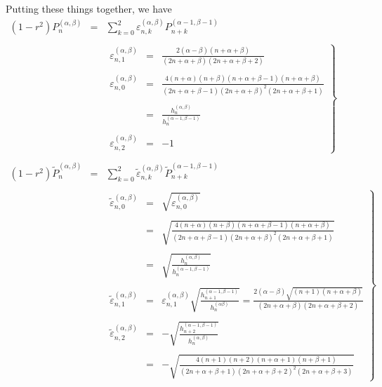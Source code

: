Putting these things together, we have
\begin{eqnarray}
  (1 - r^2) P_n^{(\alpha, \beta)} & = & \sum_{k = 0}^2 \varepsilon_{n,
  k}^{(\alpha, \beta)} P_{n + k}^{(\alpha - 1, \beta - 1)} 
  \label{eq:jacform-abd}\\
  &  &  \nonumber\\
  &  & \left. \begin{array}{lll}
    \varepsilon_{n, 1}^{(\alpha, \beta)} & = & \frac{2 (\alpha - \beta) (n +
    \alpha + \beta)}{(2 n + \alpha + \beta) (2 n + \alpha + \beta + 2)}\\
    &  & \\
    \varepsilon_{n, 0}^{(\alpha, \beta)} & = & \frac{4 (n + \alpha) (n +
    \beta) (n + \alpha + \beta - 1) (n + \alpha + \beta)}{(2 n + \alpha +
    \beta - 1) (2 n + \alpha + \beta)^2 (2 n + \alpha + \beta + 1)}\\
    &  & \\
    & = & \frac{h_n^{(\alpha, \beta)}}{h_n^{(\alpha - 1, \beta - 1)}}\\
    &  & \\
    \varepsilon^{(\alpha, \beta)}_{n, 2} & = & - 1
  \end{array} \right\}  \label{eq:jacform-epsilondef}\\
  &  &  \nonumber\\
  (1 - r^2) \tilde{P}^{(\alpha, \beta)}_n & = & \sum_{k = 0}^2
  \tilde{\varepsilon}_{n, k}^{(\alpha, \beta)}  \tilde{P}_{n + k}^{(\alpha -
  1, \beta - 1)}  \label{eq:jacform-abdn}\\
  &  &  \nonumber\\
  &  & \left. \begin{array}{lll}
    \tilde{\varepsilon}_{n, 0}^{(\alpha, \beta)} & = & \sqrt{\varepsilon_{n,
    0}^{(\alpha, \beta)}}\\
    &  & \\
    & = & \sqrt{\frac{4 (n + \alpha) (n + \beta) (n + \alpha + \beta - 1) (n
    + \alpha + \beta)}{(2 n + \alpha + \beta - 1) (2 n + \alpha + \beta)^2 (2
    n + \alpha + \beta + 1)}}\\
    &  & \\
    & = & \sqrt{\frac{h_n^{(\alpha, \beta)}}{h_n^{(\alpha - 1, \beta -
    1)}}}\\
    &  & \\
    \tilde{\varepsilon}^{(\alpha, \beta)}_{n, 1} & = & \varepsilon_{n,
    1}^{(\alpha, \beta)}  \sqrt{\frac{h_{n + 1}^{(\alpha - 1, \beta -
    1)}}{h_n^{(\alpha \beta)}}} = \frac{2 (\alpha - \beta) \sqrt{(n + 1) (n +
    \alpha + \beta)}}{(2 n + \alpha + \beta) (2 n + \alpha + \beta + 2)}\\
    &  & \\
    \tilde{\varepsilon}^{(\alpha, \beta)}_{n, 2} & = & -
    \sqrt{\frac{h^{(\alpha - 1, \beta - 1)}_{n + 2}}{h_n^{(\alpha, \beta)}}}\\
    &  & \\
    & = & - \sqrt{\frac{4 (n + 1) (n + 2) (n + \alpha + 1) (n + \beta +
    1)}{(2 n + \alpha + \beta + 1) (2 n + \alpha + \beta + 2)^2 (2 n + \alpha
    + \beta + 3)}}
  \end{array} \right\}  \label{eq:jacform-epsilontildedef}
\end{eqnarray}

